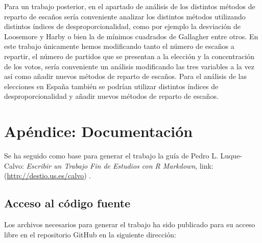 \documentclass[12pt,a4paper,]{book}
\def\ifdoblecara{} %
\def\ifprincipal{} %
\numberwithin{dummy}{section}
\theoremstyle{ocrenumbox}
\theoremstyle{blacknumex}
\theoremstyle{blacknumbox}
\theoremstyle{ocrenum}
\theoremstyle{ocrenum}
\begin{document}
Para un trabajo posterior, en el apartado de análisis de los distintos
métodos de reparto de escaños sería conveniente analizar los distintos
métodos utilizando distintos índices de desproporcionalidad, como por
ejemplo la desviación de Loosemore y Harby o bien la de mínimos
cuadrados de Gallagher entre otros. En este trabajo únicamente hemos
modificando tanto el número de escaños a repartir, el número de partidos
que se presentan a la elección y la concentración de los votos, sería
conveniente un análisis modificando las tres variables a la vez así como
añadir nuevos métodos de reparto de escaños. Para el análisis de las
elecciones en España también se podrían utilizar distintos índices de
desproporcionalidad y añadir nuevos métodos de reparto de escaños.

\FloatBarrier

\appendix

\ifdefined\ifprincipal
\else
\setlength{\parindent}{1em}
\pagestyle{fancy}
\setcounter{tocdepth}{4}
\tableofcontents

\fi

\ifdefined\ifdoblecara
\fancyhead{}{}
\fancyhead[LE,RO]{\scriptsize\rightmark}
\fancyfoot[LO,RE]{\scriptsize\slshape \leftmark}
\fancyfoot[C]{}
\fancyfoot[LE,RO]{\footnotesize\thepage}
\else
\fancyhead{}{}
\fancyhead[RO]{\scriptsize\rightmark}
\fancyfoot[LO]{\scriptsize\slshape \leftmark}
\fancyfoot[C]{}
\fancyfoot[RO]{\footnotesize\thepage}
\fi
\renewcommand{\headrulewidth}{0.4pt}
\renewcommand{\footrulewidth}{0.4pt}

\hypertarget{apuxe9ndice-documentaciuxf3n}{%
\chapter{Apéndice: Documentación}\label{apuxe9ndice-documentaciuxf3n}}

Se ha seguido como base para generar el trabajo la guía de Pedro L.
Luque-Calvo: \emph{Escribir un Trabajo Fin de Estudios con R Markdown},
link:(\url{http://destio.us.es/calvo}) .

\hypertarget{acceso-al-cuxf3digo-fuente}{%
\section{Acceso al código fuente}\label{acceso-al-cuxf3digo-fuente}}

Los archivos necesarios para generar el trabajo ha sido publicado para
su acceso libre en el repositorio GitHub en la siguiente dirección:
\end{document}
